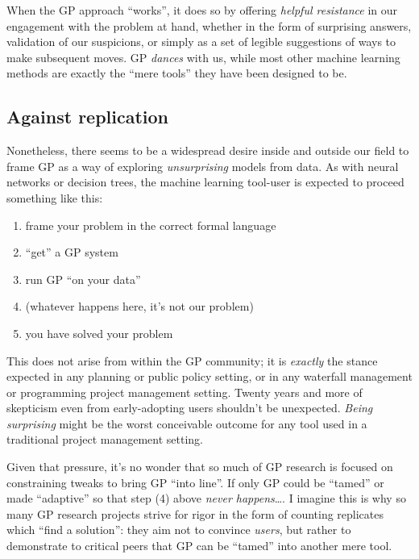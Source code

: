 When the GP approach ``works'', it does so by offering \emph{helpful resistance} in our engagement with the problem at hand, whether in the form of surprising answers, validation of our suspicions, or simply as a set of legible suggestions of ways to make subsequent moves. GP \emph{dances} with us, while most other machine learning methods are exactly the ``mere tools'' they have been designed to be.

\subsection{Against replication}\hypertarget{against-replication}{}\label{against-replication}

Nonetheless, there seems to be a widespread desire inside and outside our field to frame GP as a way of exploring \emph{unsurprising} models from data. As with neural networks or decision trees, the machine learning tool-user is expected to proceed something like this:

\begin{enumerate}
\item frame your problem in the correct formal language
\item ``get'' a GP system
\item run GP ``on your data''
\item (whatever happens here, it's not our problem)
\item you have solved your problem
\end{enumerate}

This does not arise from within the GP community; it is \emph{exactly} the stance expected in any planning or public policy setting, or in any waterfall management or programming project management setting. Twenty years and more of skepticism even from early-adopting users shouldn't be unexpected. \emph{Being surprising} might be the worst conceivable outcome for any tool used in a traditional project management setting.

Given that pressure, it's no wonder that so much of GP research is focused on constraining tweaks to bring GP ``into line''. If only GP could be ``tamed'' or made ``adaptive'' so that step (4) above \emph{never happens}\ldots{}. I imagine this is why so many GP research projects strive for rigor in the form of counting replicates which ``find a solution'': they aim not to convince \emph{users}, but rather to demonstrate to critical peers that GP can be ``tamed'' into another mere tool.

